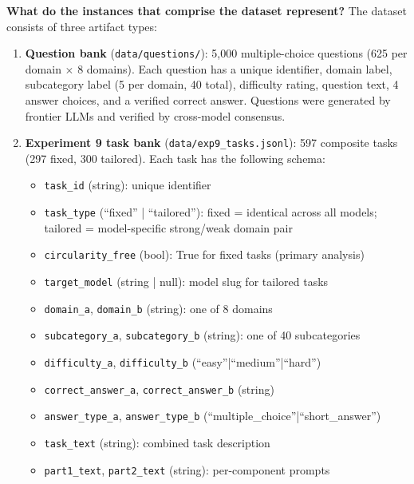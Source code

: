 \textbf{What do the instances that comprise the dataset represent?}
The dataset consists of three artifact types:

\begin{enumerate}
  \item \textbf{Question bank} (\texttt{data/questions/}): 5,000 multiple-choice questions
    (625 per domain $\times$ 8 domains). Each question has a unique identifier, domain label,
    subcategory label (5 per domain, 40 total), difficulty rating, question text, 4 answer
    choices, and a verified correct answer. Questions were generated by frontier LLMs and
    verified by cross-model consensus.

  \item \textbf{Experiment 9 task bank} (\texttt{data/exp9\_tasks.jsonl}): 597 composite
    tasks (297 fixed, 300 tailored). Each task has the following schema:
    \begin{itemize}
      \item \texttt{task\_id} (string): unique identifier
      \item \texttt{task\_type} (``fixed'' | ``tailored''): fixed = identical across all models;
        tailored = model-specific strong/weak domain pair
      \item \texttt{circularity\_free} (bool): True for fixed tasks (primary analysis)
      \item \texttt{target\_model} (string | null): model slug for tailored tasks
      \item \texttt{domain\_a}, \texttt{domain\_b} (string): one of 8 domains
      \item \texttt{subcategory\_a}, \texttt{subcategory\_b} (string): one of 40 subcategories
      \item \texttt{difficulty\_a}, \texttt{difficulty\_b} (``easy''|``medium''|``hard'')
      \item \texttt{correct\_answer\_a}, \texttt{correct\_answer\_b} (string)
      \item \texttt{answer\_type\_a}, \texttt{answer\_type\_b} (``multiple\_choice''|``short\_answer'')
      \item \texttt{task\_text} (string): combined task description
      \item \texttt{part1\_text}, \texttt{part2\_text} (string): per-component prompts
    \end{itemize}


\end{enumerate}
